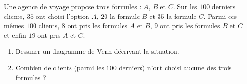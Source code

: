 
\begin{exercice}\label{exosmath-0356}


Une agence de voyage propose trois formules : \( A\), \( B\) et \( C\). Sur les \( 100\) derniers clients, \( 35\) ont choisi l'option \( A\), \( 20\) la formule \( B\) et \( 35\) la formule \( C\). Parmi ces mêmes \( 100\) clients, \( 8\) ont pris les formules \( A\) et \( B\), \( 9\) ont pris les formules \( B\) et \( C\) et enfin \( 19\) ont pris \( A\) et \( C\).

\begin{enumerate}
    \item
        Dessiner un diagramme de Venn décrivant la situation.
    \item
        Combien de clients (parmi les \( 100\) derniers) n'ont choisi aucune des trois formules ?
\end{enumerate}

\end{exercice}
